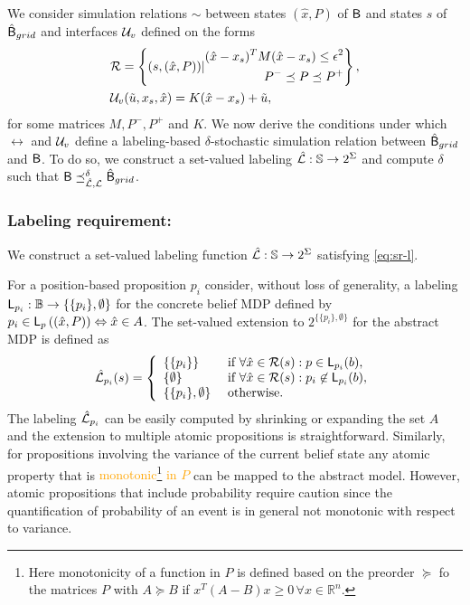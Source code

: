 \documentclass{ifacconf}
\newcommand{\red}[1]{{\color{red} #1}}
\begin{document}
We consider simulation relations $\sim$ between states $(\hat x, P)$ of $\mathsf{B}$ and states $s$ of $\hat {\mathsf{B}}_{grid}$ and interfaces $\mathcal{U}_{v}$ defined on the forms
\begin{align}
  \label{eq:rel}
    & \mathcal{R} = \left\{(s, (\hat x, P ) ) {\mid}\begin{aligned}
      (\hat x-x_s)^T M(\hat x-x_s)\leq \epsilon^2 \\
      P^-\preceq P \preceq   P^+
    \end{aligned} \right\}, \\
    & \mathcal{U}_{v}(\tilde u,  x_s, \hat x)  =K( \hat x - x_s)+\tilde u,
\end{align}
for some matrices $M, P^-, P^+$ and $K$. We now derive the conditions under which $\rel$ and $\mathcal{U}_{v}$ define a labeling-based $\delta$-stochastic simulation relation between $\hat {\mathsf{B}}_{grid}$ and $\mathsf{B}$. To do so, we construct a set-valued labeling $\hat {\mathcal{L}}: \mathbb{S} \rightarrow 2^\Sigma$ and compute $\delta$ such that $\mathsf{B}\preceq^\delta_{\hat{\mathcal{L}},\mathcal{L}}\hat {\mathsf{B}}_{grid}$.

\subsubsection{Labeling requirement:}

We construct a set-valued labeling function $\hat {\mathcal{L}}: \mathbb{S} \rightarrow 2^\Sigma$ satisfying \eqref{eq:sr-l}.

For a position-based proposition $p_i$ consider, without loss of generality, a labeling $\mathsf{L}_{p_i}: \mathbb{B} \rightarrow \{\{p_i\},\emptyset\}$ for the concrete belief MDP defined by $p_i\in\mathsf{L}_p \left( (\hat x,P) \right)  \Leftrightarrow \hat x \in A$. The set-valued extension to $2^{\{\{p_i\},\emptyset\}}$ for the abstract MDP is defined as
 \begin{align}
 	\hat {\mathcal{L}}_{p_i}(s) =\left\{\begin{array}{ll} \{\{p_i\}\} & \mbox{ if } \forall \hat x \in \mathcal{R} (s):p\in\mathsf{L}_{p_i}(b), \\
 	  \{\emptyset \} & \mbox{ if } \forall \hat x \in \mathcal{R} (s):{p_i}\not\in\mathsf{L}_{p_i}(b),\\
 	  \{\{p_i\},\emptyset\}&\mbox{ otherwise.}\end{array} \right.
 \end{align}
The labeling $\hat {\mathcal{L}}_{p_i}$ can be easily computed by shrinking or expanding the set $A$ and the extension to multiple atomic propositions is straightforward. Similarly, for propositions involving the variance of the current belief state any atomic property that is \textcolor{orange}{monotonic\footnote{\color{orange}Here monotonicity of a function in $P$ is defined based on the preorder $\succeq $ fo the matrices $P$ with $A\succeq B$ if $x^T(A-B)x\geq0\, \forall x\in\mathbb R^n$. } in $P$} can be mapped to the abstract model. However, atomic propositions that include probability require caution since the quantification of probability of an event is in general not \red{monotonic} with respect to variance.
\end{document}

